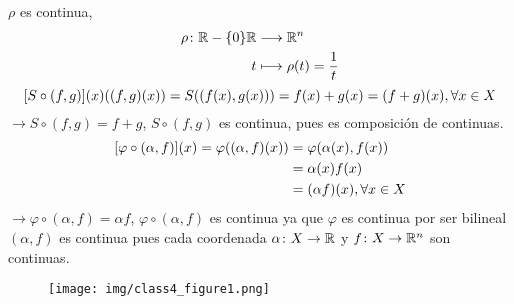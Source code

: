 {	$\rho $ es continua,
	\begin{align*}
		\rho \colon \mathbb{R}-\{0\}  \mathbb{R} & \longrightarrow\mathbb{R}^{n}               \\
		t                        & \longmapsto \rho(t)= \frac{1}{t}
	\end{align*}
	$$
		\bqty{S\circ (f,g)}(x)\qty((f,g)(x))= S\pqty{(f(x), g(x))} = f(x)+g(x) = (f+g)(x), \forall x \in X
	$$
	$\longrightarrow S\circ(f,g) =f+g $, $S\circ(f,g)$ es continua, pues es composición de continuas.
	\begin{align*}
		\bqty{\varphi \circ (\alpha, f)}(x) = \varphi((\alpha, f)(x)) & = \varphi(\alpha(x), f(x))      \\
		                                                              & =\alpha(x) f(x)                 \\
		                                                              & =(\alpha f)(x), \forall x \in X
	\end{align*}
	$\rightarrow \varphi \circ(\alpha, f) = \alpha f $, $ \varphi \circ(\alpha, f)$ es continua ya que $\varphi$ es continua por ser bilineal $(\alpha, f)$ es continua pues cada coordenada $\alpha \colon X\to \mathbb{R}$ y $f \colon X \to \mathbb{R}^{n}$ son continuas.

}
{}

\vspace{-2em}
\begin{figure}[H]
	\centering
	\texttt{[image: img/class4\_figure1.png]}
\end{figure}
\vspace{-1em}

